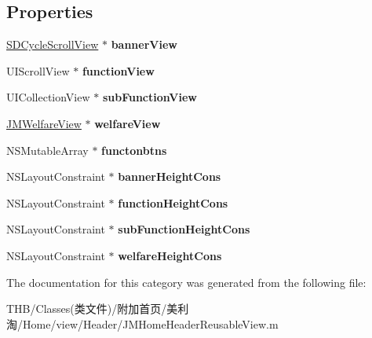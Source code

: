 \subsection*{Properties}
\begin{DoxyCompactItemize}
\item 
\mbox{\label{category_j_m_home_header_reusable_view_07_08_a9d2030aa3ddb0a8b1eedaadde254b798}} 
\mbox{\hyperlink{interface_s_d_cycle_scroll_view}{S\+D\+Cycle\+Scroll\+View}} $\ast$ {\bfseries banner\+View}
\item 
\mbox{\label{category_j_m_home_header_reusable_view_07_08_a52c2cc96f5e3d27ec865703d81393788}} 
U\+I\+Scroll\+View $\ast$ {\bfseries function\+View}
\item 
\mbox{\label{category_j_m_home_header_reusable_view_07_08_ab9e58f4b7e0678c6ae21e55b9a09fe21}} 
U\+I\+Collection\+View $\ast$ {\bfseries sub\+Function\+View}
\item 
\mbox{\label{category_j_m_home_header_reusable_view_07_08_acba68e22346dd058579c61aca618f6a1}} 
\mbox{\hyperlink{interface_j_m_welfare_view}{J\+M\+Welfare\+View}} $\ast$ {\bfseries welfare\+View}
\item 
\mbox{\label{category_j_m_home_header_reusable_view_07_08_acf9562014253a2c1a13ed954b0f5deb2}} 
N\+S\+Mutable\+Array $\ast$ {\bfseries functonbtns}
\item 
\mbox{\label{category_j_m_home_header_reusable_view_07_08_ab070eec01380d0d8aea2d5db707df149}} 
N\+S\+Layout\+Constraint $\ast$ {\bfseries banner\+Height\+Cons}
\item 
\mbox{\label{category_j_m_home_header_reusable_view_07_08_a821995370edacb76849a1b99443a9c08}} 
N\+S\+Layout\+Constraint $\ast$ {\bfseries function\+Height\+Cons}
\item 
\mbox{\label{category_j_m_home_header_reusable_view_07_08_a1ddf8753e39d9b70136598be6c966ec5}} 
N\+S\+Layout\+Constraint $\ast$ {\bfseries sub\+Function\+Height\+Cons}
\item 
\mbox{\label{category_j_m_home_header_reusable_view_07_08_a115d43b27d49c52d5b020d975f1cf5f7}} 
N\+S\+Layout\+Constraint $\ast$ {\bfseries welfare\+Height\+Cons}
\end{DoxyCompactItemize}


The documentation for this category was generated from the following file\+:\begin{DoxyCompactItemize}
\item 
T\+H\+B/\+Classes(类文件)/附加首页/美利淘/\+Home/view/\+Header/J\+M\+Home\+Header\+Reusable\+View.\+m\end{DoxyCompactItemize}
